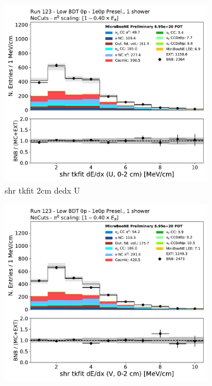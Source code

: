 \begin{figure}[H]
    \centering
    \begin{subfigure}{0.3\textwidth}
    \includegraphics[width=1.0\textwidth]{1e0p/Low_BDT_Sideband/shr_tkfit_2cm_dedx_U.pdf}
    \caption{shr tkfit 2cm dedx U}
    \end{subfigure}
    \begin{subfigure}{0.3\textwidth}
    \includegraphics[width=1.0\textwidth]{1e0p/Low_BDT_Sideband/shr_tkfit_2cm_dedx_V.pdf}

\end{subfigure}
\end{figure}
